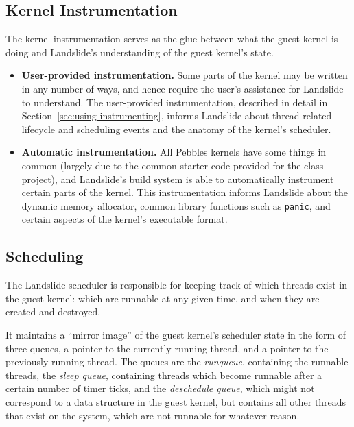 \subsection{Kernel Instrumentation}
\label{sec:components-kern}

The kernel instrumentation serves as the glue between what the guest kernel is doing and Landslide's understanding of the guest kernel's state.

\begin{itemize}
	\item {\bf User-provided instrumentation.} Some parts of the kernel may be written in any number of ways, and hence require the user's assistance for Landslide to understand. The user-provided instrumentation, described in detail in Section~\ref{sec:using-instrumenting}, informs Landslide about thread-related lifecycle and scheduling events and the anatomy of the kernel's scheduler.
	\item {\bf Automatic instrumentation.} All Pebbles kernels have some things in common (largely due to the common starter code provided for the class project), and Landslide's build system is able to automatically instrument certain parts of the kernel. This instrumentation informs Landslide about the dynamic memory allocator, common library functions such as \texttt{panic}, and certain aspects of the kernel's executable format.
\end{itemize}

\subsection{Scheduling}
\label{sec:components-sched}

The Landslide scheduler is responsible for keeping track of which threads exist in the guest kernel: which are runnable at any given time, and when they are created and destroyed.

It maintains a ``mirror image'' of the guest kernel's scheduler state in the form of three queues, a pointer to the currently-running thread, and a pointer to the previously-running thread. The queues are the {\em runqueue}, containing the runnable threads, the {\em sleep queue}, containing threads which become runnable after a certain number of timer ticks, and the {\em deschedule queue}, which might not correspond to a data structure in the guest kernel, but contains all other threads that exist on the system, which are not runnable for whatever reason.

